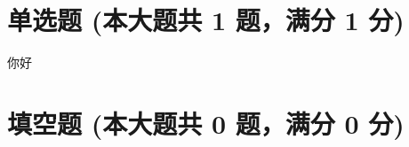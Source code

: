 \documentclass[12pt, a4paper, addpoints]{exam}
\begin{document}
\pagestyle{headandfoot}

\begin{center}
\end{center}
\vspace{5mm}

\normalsize
\vspace{5mm}

\section{\normalsize{单选题 (本大题共 1 题，满分 1 分)}}
\hspace{1.5cm}

\begin{questions}
\question[1] 你好

\begin{oneparchoices}
\end{oneparchoices}

\end{questions}

\hspace{5cm}

\section{\normalsize{填空题 (本大题共 0 题，满分 0 分)}}
\hspace{1.5cm}

\begin{questions}

\end{questions}
\end{document}
